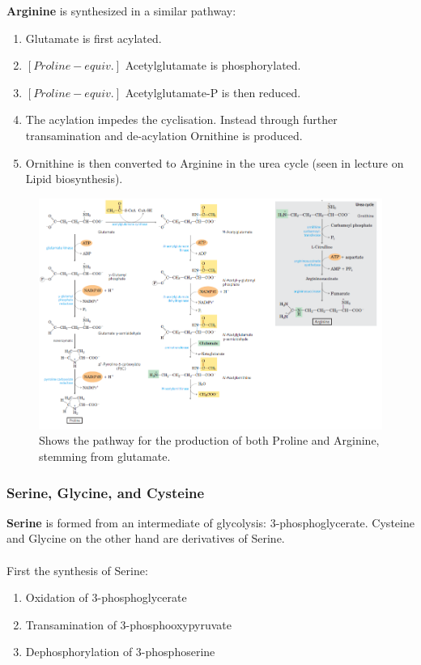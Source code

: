 \documentclass[../main.tex]{subfiles}
\begin{document}
\textbf{\gls{Arginine}} is synthesized in a similar pathway:
\begin{enumerate}
	\item Glutamate is first acylated.
	\item $[Proline-equiv.]$ Acetylglutamate is phosphorylated.
	\item $[Proline-equiv.]$ Acetylglutamate-P is then reduced.
	\item The acylation impedes the cyclisation. Instead through further transamination and de-acylation Ornithine is produced.
	\item Ornithine is then converted to Arginine in the urea cycle (seen in lecture on Lipid biosynthesis).
\end{enumerate}

\begin{figure}[H]
	\centering
	\includegraphics[width=0.8\linewidth]{pro_arg}
	\caption{Shows the pathway for the production of both Proline and Arginine, stemming from glutamate.}
	\label{fig:proarg}
\end{figure}


\subsubsection{Serine, Glycine, and Cysteine}

\textbf{\gls{Serine}} is formed from an intermediate of glycolysis: 3-phosphoglycerate. Cysteine and Glycine on the other hand are derivatives of Serine. \\
\\
First the synthesis of Serine:
\begin{enumerate}
	\item Oxidation of 3-phosphoglycerate
	\item Transamination of 3-phosphooxypyruvate
	\item Dephosphorylation of 3-phosphoserine
\end{enumerate}
\end{document}
